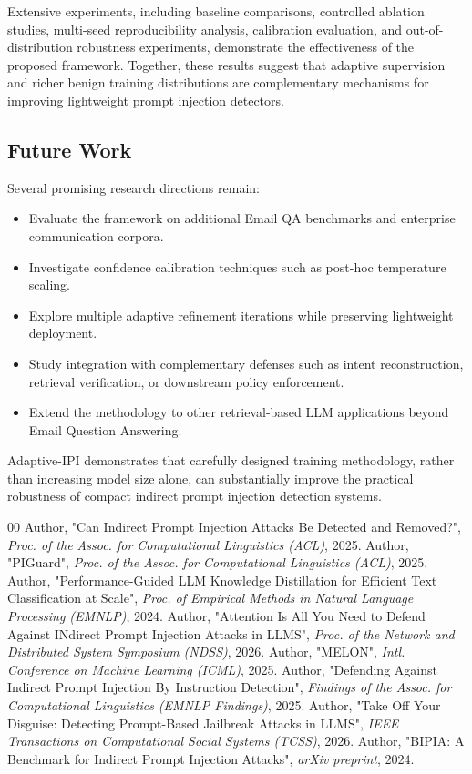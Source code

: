 \documentclass[conference]{IEEEtran}
\begin{document}
Extensive experiments, including baseline comparisons, controlled ablation studies, multi-seed
reproducibility analysis, calibration evaluation, and out-of-distribution robustness experiments,
demonstrate the effectiveness of the proposed framework. Together, these results suggest that
adaptive supervision and richer benign training distributions are complementary mechanisms for
improving lightweight prompt injection detectors.

\subsection{Future Work}

Several promising research directions remain:
\begin{itemize}
    \item Evaluate the framework on additional Email QA benchmarks and enterprise communication corpora.
    \item Investigate confidence calibration techniques such as post-hoc temperature scaling.
    \item Explore multiple adaptive refinement iterations while preserving lightweight deployment.
    \item Study integration with complementary defenses such as intent reconstruction, retrieval verification, or downstream policy enforcement.
    \item Extend the methodology to other retrieval-based LLM applications beyond Email Question Answering.
\end{itemize}

Adaptive-IPI demonstrates that carefully designed training methodology, rather than increasing model
size alone, can substantially improve the practical robustness of compact indirect prompt injection
detection systems.

\begin{thebibliography}{00}
 Author, "Can Indirect Prompt Injection Attacks Be Detected and Removed?", \textit{Proc. of the Assoc. for Computational Linguistics (ACL)}, 2025.
 Author, "PIGuard", \textit{Proc. of the Assoc. for Computational Linguistics (ACL)}, 2025.
 Author, "Performance-Guided LLM Knowledge Distillation for Efficient Text Classification at Scale", \textit{Proc. of Empirical Methods in Natural Language Processing (EMNLP)}, 2024.
 Author, "Attention Is All You Need to Defend Against INdirect Prompt Injection Attacks in LLMS", \textit{Proc. of the Network and Distributed System Symposium (NDSS)}, 2026.
 Author, "MELON", \textit{Intl. Conference on Machine Learning (ICML)}, 2025.
 Author, "Defending Against Indirect Prompt Injection By Instruction Detection", \textit{Findings of the Assoc. for Computational Linguistics (EMNLP Findings)}, 2025.
 Author, "Take Off Your Disguise: Detecting Prompt-Based Jailbreak Attacks in LLMS", \textit{IEEE Transactions on Computational Social Systems (TCSS)}, 2026.
 Author, "BIPIA: A Benchmark for Indirect Prompt Injection Attacks", \textit{arXiv preprint}, 2024.
\end{thebibliography}
\end{document}
